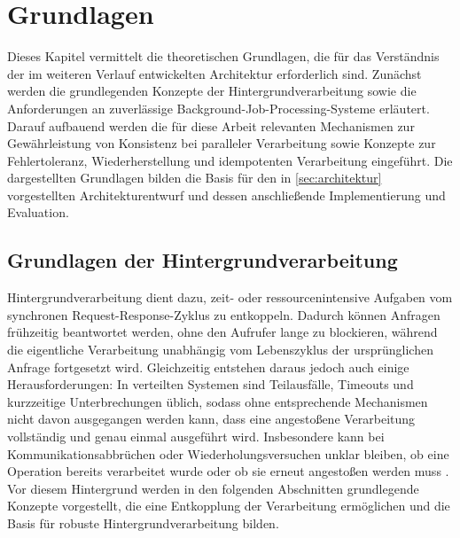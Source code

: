 \chapter{Grundlagen}
\label{ch:grundlagen}
Dieses Kapitel vermittelt die theoretischen Grundlagen, die für das Verständnis der im weiteren Verlauf entwickelten
Architektur erforderlich sind.
Zunächst werden die grundlegenden Konzepte der Hintergrundverarbeitung sowie die Anforderungen an zuverlässige
Background-Job-Processing-Systeme erläutert.
Darauf aufbauend werden die für diese Arbeit relevanten Mechanismen zur Gewährleistung von Konsistenz bei paralleler
Verarbeitung sowie Konzepte zur Fehlertoleranz, Wiederherstellung und idempotenten Verarbeitung eingeführt.
Die dargestellten Grundlagen bilden die Basis für den in \cref{sec:architektur} vorgestellten Architekturentwurf und dessen
anschließende Implementierung und Evaluation.

\section{Grundlagen der Hintergrundverarbeitung}
\label{sec:hintergrundverarbeitung}
Hintergrundverarbeitung dient dazu, zeit- oder ressourcenintensive Aufgaben vom synchronen Request-Response-Zyklus zu entkoppeln.
Dadurch können Anfragen frühzeitig beantwortet werden, ohne den Aufrufer lange zu blockieren, während die eigentliche Verarbeitung
unabhängig vom Lebenszyklus der ursprünglichen Anfrage fortgesetzt wird.
Gleichzeitig entstehen daraus jedoch auch einige Herausforderungen: In verteilten Systemen sind Teilausfälle,
Timeouts und kurzzeitige Unterbrechungen üblich, sodass ohne entsprechende Mechanismen nicht davon ausgegangen werden kann,
dass eine angestoßene Verarbeitung vollständig und genau einmal ausgeführt wird.
Insbesondere kann bei Kommunikationsabbrüchen oder Wiederholungsversuchen unklar bleiben, ob eine Operation bereits verarbeitet
wurde oder ob sie erneut angestoßen werden muss \parencite[Kap.~8]{kleppmann_designing_2017}.
Vor diesem Hintergrund werden in den folgenden Abschnitten grundlegende Konzepte vorgestellt, die eine Entkopplung der
Verarbeitung ermöglichen und die Basis für robuste Hintergrundverarbeitung bilden.

